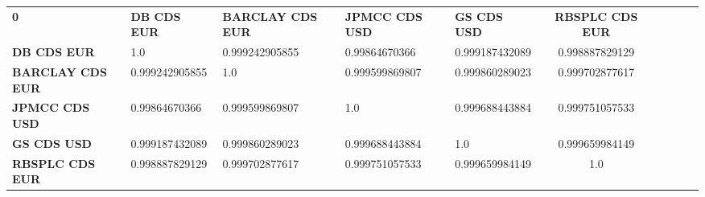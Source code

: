 \begin{center}
 \begin{tabular}{|l|l|l|l|l|c|c|c|c|c|}
\hline
\textbf{0} & \textbf{DB CDS EUR} & \textbf{BARCLAY CDS EUR} & \textbf{JPMCC CDS USD} & \textbf{GS CDS USD} & \textbf{RBSPLC CDS EUR}\\\hhline{|=|=|=|=|=|=|}
\textbf{DB CDS EUR} & 1.0 & 0.999242905855 & 0.99864670366 & 0.999187432089 & 0.998887829129\\
\textbf{BARCLAY CDS EUR} & 0.999242905855 & 1.0 & 0.999599869807 & 0.999860289023 & 0.999702877617\\
\textbf{JPMCC CDS USD} & 0.99864670366 & 0.999599869807 & 1.0 & 0.999688443884 & 0.999751057533\\
\textbf{GS CDS USD} & 0.999187432089 & 0.999860289023 & 0.999688443884 & 1.0 & 0.999659984149\\
\textbf{RBSPLC CDS EUR} & 0.998887829129 & 0.999702877617 & 0.999751057533 & 0.999659984149 & 1.0\\
\hline
\end{tabular}
\end{center}
